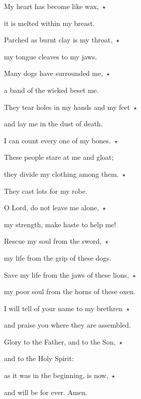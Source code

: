 \noindent My heart has become like wax,~$\star$~\nopagebreak

it is melted within my breast.

\noindent Parched as burnt clay is my throat,~$\star$~\nopagebreak

my tongue cleaves to my jaws.

\noindent Many dogs have surrounded me,~$\star$~\nopagebreak

a band of the wicked beset me.

\noindent They tear holes in my hands and my feet~$\star$~\nopagebreak

and lay me in the dust of death.

\noindent I can count every one of my bones.~$\star$~\nopagebreak

These people stare at me and gloat; 

\noindent they divide my clothing among them.~$\star$~\nopagebreak

They cast lots for my robe.

\noindent O Lord, do not leave me alone,~$\star$~\nopagebreak

my strength, make haste to help me!

\noindent Rescue my soul from the sword,~$\star$~\nopagebreak

my life from the grip of these dogs.

\noindent Save my life from the jaws of these lions,~$\star$~\nopagebreak

my poor soul from the horns of these oxen.

\noindent I will tell of your name to my brethren~$\star$~\nopagebreak

and praise you where they are assembled.

\noindent Glory to the Father, and to the Son,~$\star$~\nopagebreak

and to the Holy Spirit:

\noindent as it was in the beginning, is now,~$\star$~\nopagebreak

and will be for ever. Amen.